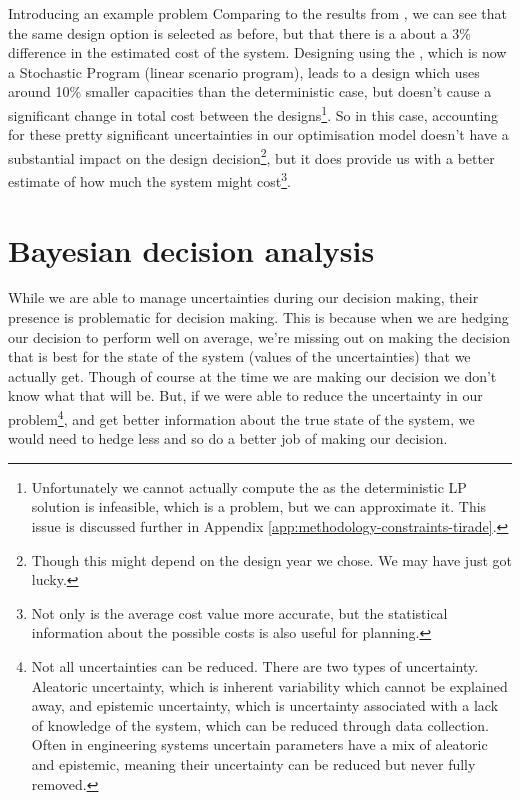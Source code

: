 \begin{ebox}[label=ebox:opt]{Introducing an example problem}
    Comparing to the results from , we can see that the same design option is selected as before, but that there is a about a 3\% difference in the estimated cost of the system.
    Designing using the , which is now a Stochastic Program (linear scenario program), leads to a design which uses around 10\% smaller capacities than the deterministic case, but doesn't cause a significant change in total cost between the designs\footnote{Unfortunately we cannot actually compute the  as the deterministic LP solution is infeasible, which is a problem, but we can approximate it. This issue is discussed further in Appendix \ref{app:methodology-constraints-tirade}.}.
    So in this case, accounting for these pretty significant uncertainties in our optimisation model doesn't have a substantial impact on the design decision\footnote{Though this might depend on the design year we chose. We may have just got lucky.}, but it does provide us with a better estimate of how much the system might cost\footnote{Not only is the average cost value more accurate, but the statistical information about the possible costs is also useful for planning.}.
\end{ebox}

\newpage
\section{Bayesian decision analysis} \label{sec:methodology-bayesian-decision-analysis}


While we are able to manage uncertainties during our decision making, their presence is problematic for decision making. This is because when we are hedging our decision to perform well on average, we're missing out on making the decision that is best for the state of the system (values of the uncertainties) that we actually get. Though of course at the time we are making our decision we don't know what that will be. But, if we were able to reduce the uncertainty in our problem\footnote{Not all uncertainties can be reduced. There are two types of uncertainty. Aleatoric uncertainty, which is inherent variability which cannot be explained away, and epistemic uncertainty, which is uncertainty associated with a lack of knowledge of the system, which can be reduced through data collection. Often in engineering systems uncertain parameters have a mix of aleatoric and epistemic, meaning their uncertainty can be reduced but never fully removed.\label{fn:aleatoric}}, and get better information about the true state of the system, we would need to hedge less and so do a better job of making our decision.

